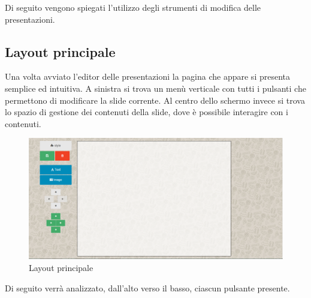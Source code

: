 Di seguito vengono spiegati l'utilizzo degli strumenti di modifica delle presentazioni.

\subsection{Layout principale}
Una volta avviato l'editor delle presentazioni la pagina che appare si presenta semplice ed intuitiva. A sinistra si trova un menù verticale con tutti i pulsanti che permettono di modificare la \gls{slide} corrente. Al centro dello schermo invece si trova lo spazio di gestione dei contenuti della \gls{slide}, dove è possibile interagire con i contenuti.

\begin{figure}[H] 
	\centering 
	\includegraphics[scale=0.40] {img/layout_editor.png}
	\caption{Layout principale} 
\end{figure}

Di seguito verrà analizzato, dall'alto verso il basso, ciascun pulsante presente.

